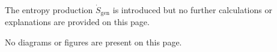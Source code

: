 The entropy production \( \dot{S}_{\text{gen}} \) is introduced but no further calculations or explanations are provided on this page.  

No diagrams or figures are present on this page.